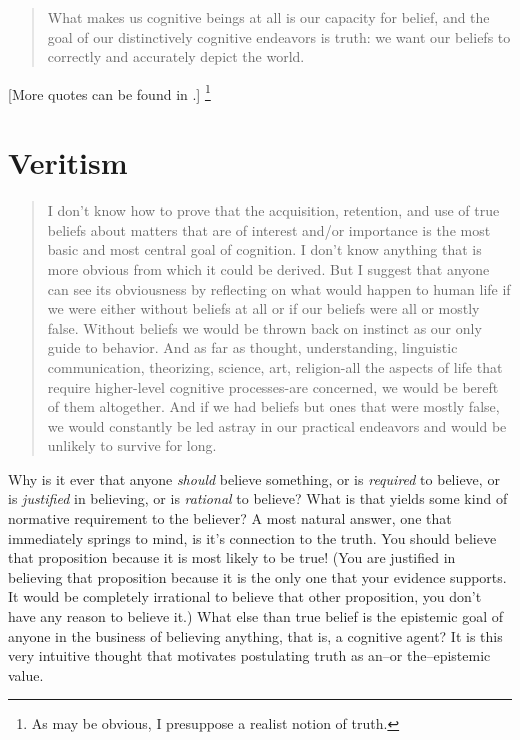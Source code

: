 \documentclass[12pt,numbers=noenddot]{scrartcl}
\begin{document}
\begin{quote}
What makes us cognitive beings at all is our capacity for belief, and the goal of our distinctively cognitive endeavors is truth: we want our beliefs to correctly and accurately depict the world. \parencite[7]{Bonjour1985}
\end{quote}

[More quotes can be found in \textcite{Goldman2002-GOLTUO-2}.]
\footnote{As may be obvious, I presuppose a realist notion of truth.}
\section{Veritism}

\begin{quote}
I don't know how to prove that the acquisition, retention, and use of true beliefs about matters that are of interest and/or importance is the most basic and most central goal of cognition. I don't know anything that is more obvious from which it could be derived. But I suggest that anyone can see its obviousness by reflecting on what would happen to human life if we were either without beliefs at all or if our beliefs were all or mostly false. Without beliefs we would be thrown back on instinct as our only guide to behavior. And as far as thought, understanding, linguistic communication, theorizing, science, art, religion-all the aspects of life that require higher-level cognitive processes-are concerned, we would be bereft of them altogether. And if we had beliefs but ones that were mostly false, we would constantly be led astray in our practical endeavors and would be unlikely to survive for long. \parencite[30]{Alston2005-ALSBJD}
\end{quote}

Why is it ever that anyone \emph{should} believe something, or is \emph{required} to believe, or is \emph{justified} in believing, or is \emph{rational} to believe? What is that yields some kind of normative requirement to the believer? A most natural answer, one that immediately springs to mind, is it's connection to the truth. You should believe that proposition because it is most likely to be true! (You are justified in believing that proposition because it is the only one that your evidence supports. It would be completely irrational to believe that other proposition, you don't have any reason to believe it.) What else than true belief is the epistemic goal of anyone in the business of believing anything, that is, a cognitive agent? It is this very intuitive thought that motivates postulating truth as an--or the--epistemic value.
\end{document}
